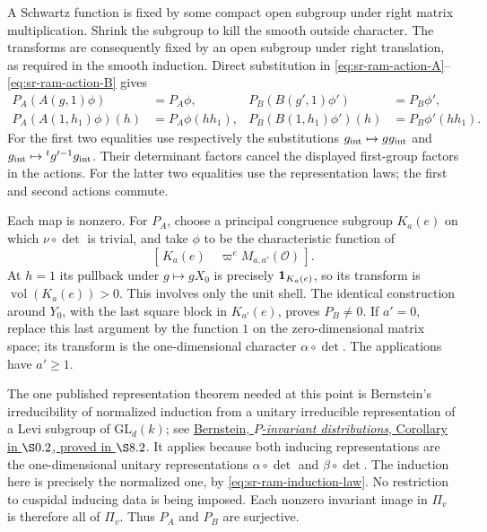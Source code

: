 A Schwartz function is fixed by some compact open subgroup
under right matrix multiplication.  Shrink the subgroup to kill
the smooth outside character.  The transforms are consequently
fixed by an open subgroup under right translation, as required
in the smooth induction.  Direct substitution in
\eqref{eq:sr-ram-action-A}--\eqref{eq:sr-ram-action-B} gives
\begin{align}
 P_A(A(g,1)\phi)&=P_A\phi,&
 P_B(B(g',1)\phi')&=P_B\phi',\label{eq:sr-ram-first-invariance}\\
 P_A(A(1,h_1)\phi)(h)&=P_A\phi(hh_1),&
 P_B(B(1,h_1)\phi')(h)&=P_B\phi'(hh_1).
 \label{eq:sr-ram-second-equivariance}
\end{align}
For the first two equalities use respectively the substitutions
\(g_{\rm int}\mapsto gg_{\rm int}\) and
\(g_{\rm int}\mapsto{}^tg'^{-1}g_{\rm int}\).
Their determinant factors cancel the displayed first-group
factors in the actions.  For the latter two equalities use the
representation laws; the first and second actions commute.

Each map is nonzero.  For \(P_A\), choose a principal congruence
subgroup \(K_a(e)\) on which \(\nu\circ\det\) is trivial, and
take \(\phi\) to be the characteristic function of
\[
       [\,K_a(e)\quad \varpi^eM_{a,a'}(\mathcal O)\,].
\]
At \(h=1\) its pullback under \(g\mapsto gX_0\) is precisely
\({\bf1}_{K_a(e)}\), so its transform is
\(\operatorname{vol}(K_a(e))>0\).  This involves only the unit
shell.  The identical construction around \(Y_0\), with the
last square block in \(K_{a'}(e)\), proves \(P_B\ne0\).
If \(a'=0\), replace this last argument by the function \(1\)
on the zero-dimensional matrix space; its transform is the
one-dimensional character \(\alpha\circ\det\).
The applications have \(a'\ge1\).

The one published representation theorem needed at this point
is Bernstein's irreducibility of normalized induction from a
unitary irreducible representation of a Levi subgroup of
\(\mathrm{GL}_d(k)\); see
\href{https://www.math.tau.ac.il/~bernstei/Publication_list/publication_texts/Bernstein-P-invar-SLN.pdf}
{Bernstein, \emph{\(P\)-invariant distributions}, Corollary in
\(\S0.2\), proved in \(\S8.2\)}.
It applies because both inducing representations are the
one-dimensional unitary representations \(\alpha\circ\det\)
and \(\beta\circ\det\).  The induction here is precisely the
normalized one, by \eqref{eq:sr-ram-induction-law}.
No restriction to cuspidal inducing data is being imposed.
Each nonzero invariant image in \(\Pi_v\) is therefore all of
\(\Pi_v\).  Thus \(P_A\) and \(P_B\) are surjective.

